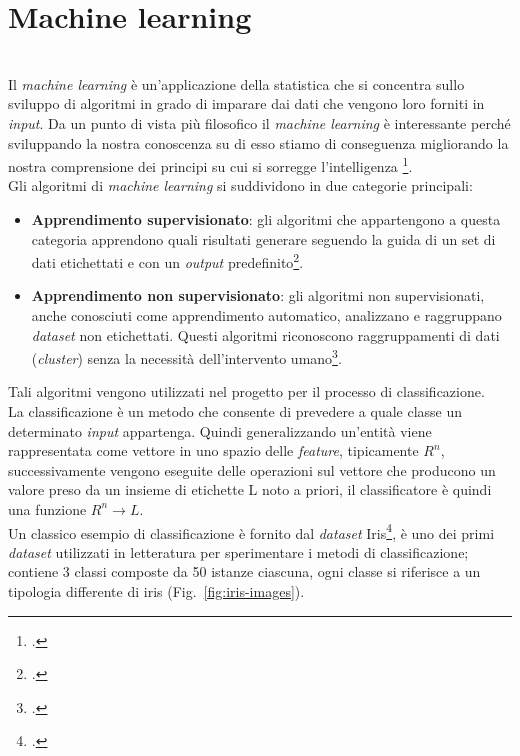 \chapter{Machine learning}
\label{cap:teoria}
\\Il \emph{machine learning} è un'applicazione della statistica che si concentra sullo sviluppo di algoritmi in grado di imparare dai dati che vengono loro forniti in \emph{input}.
Da un punto di vista più filosofico il \emph{machine learning} è interessante perché sviluppando la nostra conoscenza su di esso stiamo di conseguenza migliorando la nostra comprensione dei principi su cui si sorregge l'intelligenza \footcite[p.~97]{Goodfellow-et-al-2016}.\\Gli algoritmi di \emph{machine learning} si suddividono in due categorie principali:

\begin{itemize}
    \item \textbf{Apprendimento supervisionato}: gli algoritmi che appartengono a questa categoria apprendono quali risultati generare seguendo la guida di un set di dati etichettati e con un \emph{output} predefinito\footcite{site:machine-learning}.

    \item \textbf{Apprendimento non supervisionato}: gli algoritmi non supervisionati, anche conosciuti come apprendimento automatico, analizzano e raggruppano \emph{\gls{dataset}} non etichettati. Questi algoritmi riconoscono raggruppamenti di dati (\emph{cluster}) senza la necessità dell'intervento umano\footcite{site:machine-learning}.
\end{itemize}
Tali algoritmi vengono utilizzati nel progetto per il processo di classificazione.\\
La classificazione è un metodo che consente di prevedere a quale classe un determinato \emph{input} appartenga. 
Quindi generalizzando un'entità viene rappresentata come vettore in uno spazio delle \emph{\gls{feature}}, tipicamente \( R^n \), successivamente vengono eseguite delle operazioni sul vettore che producono un valore preso da un insieme di etichette L noto a priori, il classificatore è quindi una funzione \( R^n \rightarrow L \).\\Un classico esempio di classificazione è fornito dal \emph{\gls{dataset}} Iris\footcite{site:iris-dataset}, è uno dei primi \emph{\gls{dataset}} utilizzati in letteratura per sperimentare i metodi di classificazione; contiene 3 classi composte da 50 istanze ciascuna, ogni classe si riferisce a un tipologia differente di iris (Fig.~\ref{fig:iris-images}).

